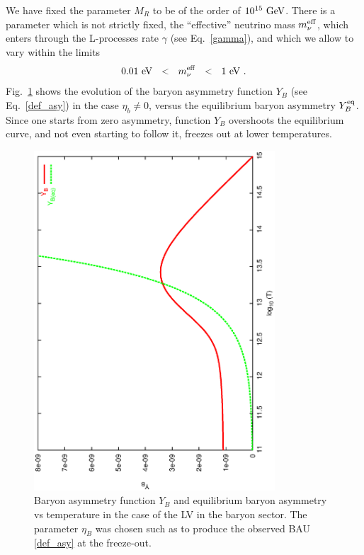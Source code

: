 \documentclass[12pt]{revtex4}
\newcommand{\eq}{{\rm eq}}
\newcommand{\meff}{m^{\rm eff}_\nu}
\newcommand{\GeV}{{\rm GeV}}
\newcommand{\eV}{{\rm eV}}
\begin{document}
	We have fixed the parameter $ M_R $ to be of the order of 
	$ 10^{15}~\GeV $.
	There is a parameter which is not strictly fixed,
	the ``effective'' neutrino mass $ \meff $, which enters
	through the
	L-processes rate $ \gamma $ (see Eq.~\eqref{gamma}),
	and which we allow to vary within the limits 
\[
	0.01~\eV ~~<~~ \meff ~~<~~1~\eV~.
\]
	Fig.~\ref{b_dom_asymm_bau} shows the evolution of the baryon
	asymmetry function $ Y_B $ (see Eq.~\eqref{def_asy}) in the case
	$ \eta_b \neq 0 $, versus the equilibrium baryon asymmetry 
	$ Y_B^{\eq} $.
	Since one starts from zero asymmetry, function $ Y_B $ overshoots
	the equilibrium curve, and not even starting to follow it, freezes out
	at lower temperatures. 
\begin{figure}
\includegraphics[width=9cm,angle=270]{b_dom_asymm_bau.ps}
\caption{Baryon asymmetry function $ Y_B $ and equilibrium baryon asymmetry vs 
	temperature in the case of the LV in the baryon sector. 
	The parameter $ \eta_B $ was chosen such as to produce the observed BAU 
	\eqref{def_asy} at the freeze-out.}
\label{b_dom_asymm_bau}
\end{figure}
\end{document}
